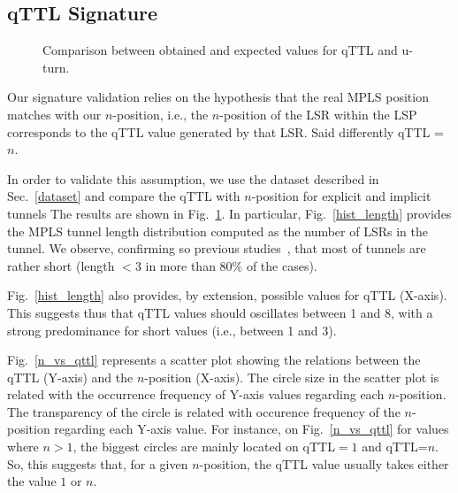 \subsection{qTTL Signature}\label{validation.qttl}
\begin{figure}[!t]
  \begin{center}
\hspace{-0.3cm}      
  \end{center}
  \caption{Comparison between obtained and expected values for qTTL and u-turn.}
  \label{validation.qttl.fig}
\end{figure}

Our signature validation relies on the hypothesis that the real MPLS position matches
with our $n$-position, i.e., the $n$-position of the LSR within the LSP corresponds 
to the qTTL value generated by that LSR. 
Said differently qTTL = $n$.

In order to validate this assumption, we use the dataset described in
Sec.~\ref{dataset} and compare the qTTL with $n$-position for explicit and implicit tunnels %
The results are shown in Fig.~\ref{validation.qttl.fig}.  In
particular, Fig.~\ref{hist_length} provides the MPLS tunnel length distribution
computed as the number of LSRs in the tunnel.  We observe, confirming so
previous studies~\cite{SOM11,Vanaubel15,Donnet12}, that most of tunnels are
rather short (length $< 3$ in more than 80\% of the cases). 

Fig.~\ref{hist_length} also provides, by extension, possible values for qTTL
(X-axis).  This suggests thus that qTTL values should oscillates between 1 and
8, with a strong predominance for short values (i.e., between 1 and 3). 

Fig.~\ref{n_vs_qttl} represents a scatter plot showing the relations between the
qTTL (Y-axis) and the $n$-position (X-axis).  The circle size in the scatter
plot is related with the occurrence frequency of Y-axis values regarding each
$n$-position.  The transparency of the circle is related with occurence
frequency of the $n$-position regarding each Y-axis value.  For instance, on
Fig.~\ref{n_vs_qttl} for values where $n>1$, the biggest circles are mainly
located on qTTL$=1$ and qTTL=$n$.  So, this suggests that, for a given
$n$-position, the qTTL value usually takes either the value $1$ or $n$.

